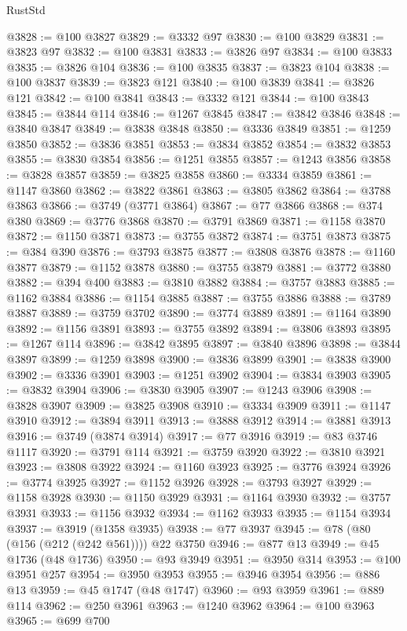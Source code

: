 \begin{lexlean}{RustStd}
\begin{coremodule}
@3828 := @100 @3827
@3829 := @3332 @97
@3830 := @100 @3829
@3831 := @3823 @97
@3832 := @100 @3831
@3833 := @3826 @97
@3834 := @100 @3833
@3835 := @3826 @104
@3836 := @100 @3835
@3837 := @3823 @104
@3838 := @100 @3837
@3839 := @3823 @121
@3840 := @100 @3839
@3841 := @3826 @121
@3842 := @100 @3841
@3843 := @3332 @121
@3844 := @100 @3843
@3845 := @3844 @114
@3846 := @1267 @3845
@3847 := @3842 @3846
@3848 := @3840 @3847
@3849 := @3838 @3848
@3850 := @3336 @3849
@3851 := @1259 @3850
@3852 := @3836 @3851
@3853 := @3834 @3852
@3854 := @3832 @3853
@3855 := @3830 @3854
@3856 := @1251 @3855
@3857 := @1243 @3856
@3858 := @3828 @3857
@3859 := @3825 @3858
@3860 := @3334 @3859
@3861 := @1147 @3860
@3862 := @3822 @3861
@3863 := @3805 @3862
@3864 := @3788 @3863
@3866 := @3749 (@3771 @3864)
@3867 := @77 @3866
@3868 := @374 @380
@3869 := @3776 @3868
@3870 := @3791 @3869
@3871 := @1158 @3870
@3872 := @1150 @3871
@3873 := @3755 @3872
@3874 := @3751 @3873
@3875 := @384 @390
@3876 := @3793 @3875
@3877 := @3808 @3876
@3878 := @1160 @3877
@3879 := @1152 @3878
@3880 := @3755 @3879
@3881 := @3772 @3880
@3882 := @394 @400
@3883 := @3810 @3882
@3884 := @3757 @3883
@3885 := @1162 @3884
@3886 := @1154 @3885
@3887 := @3755 @3886
@3888 := @3789 @3887
@3889 := @3759 @3702
@3890 := @3774 @3889
@3891 := @1164 @3890
@3892 := @1156 @3891
@3893 := @3755 @3892
@3894 := @3806 @3893
@3895 := @1267 @114
@3896 := @3842 @3895
@3897 := @3840 @3896
@3898 := @3844 @3897
@3899 := @1259 @3898
@3900 := @3836 @3899
@3901 := @3838 @3900
@3902 := @3336 @3901
@3903 := @1251 @3902
@3904 := @3834 @3903
@3905 := @3832 @3904
@3906 := @3830 @3905
@3907 := @1243 @3906
@3908 := @3828 @3907
@3909 := @3825 @3908
@3910 := @3334 @3909
@3911 := @1147 @3910
@3912 := @3894 @3911
@3913 := @3888 @3912
@3914 := @3881 @3913
@3916 := @3749 (@3874 @3914)
@3917 := @77 @3916
@3919 := @83 @3746 @1117
@3920 := @3791 @114
@3921 := @3759 @3920
@3922 := @3810 @3921
@3923 := @3808 @3922
@3924 := @1160 @3923
@3925 := @3776 @3924
@3926 := @3774 @3925
@3927 := @1152 @3926
@3928 := @3793 @3927
@3929 := @1158 @3928
@3930 := @1150 @3929
@3931 := @1164 @3930
@3932 := @3757 @3931
@3933 := @1156 @3932
@3934 := @1162 @3933
@3935 := @1154 @3934
@3937 := @3919 (@1358 @3935)
@3938 := @77 @3937
@3945 := @78 (@80 (@156 (@212 (@242 @561)))) @22 @3750
@3946 := @877 @13
@3949 := @45 @1736 (@48 @1736)
@3950 := @93 @3949
@3951 := @3950 @314
@3953 := @100 @3951 @257
@3954 := @3950 @3953
@3955 := @3946 @3954
@3956 := @886 @13
@3959 := @45 @1747 (@48 @1747)
@3960 := @93 @3959
@3961 := @889 @114
@3962 := @250 @3961
@3963 := @1240 @3962
@3964 := @100 @3963
@3965 := @699 @700

\end{coremodule}
\end{lexlean}
